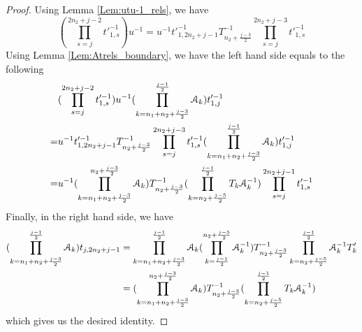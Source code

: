 \documentclass{amsart}
\begin{document}
\begin{proof}
Using Lemma \ref{Lem:utu-1_rels}, we have
\[
(\prod^{2n_2+j-2}_{s=j} t'^{-1}_{1,s})u^{-1}=u^{-1} t'^{-1}_{1,2n_2+j-1}T^{-1}_{n_2+\frac{j-3}{2}}\prod^{2n_2+j-3}_{s=j} t'^{-1}_{1,s}
\]
Using Lemma \ref{Lem:Atrels_boundary}, we have the left hand side equals to the following
\[
\begin{aligned}
&(\prod^{2n_2+j-2}_{s=j} t'^{-1}_{1,s})u^{-1}(\prod^{\frac{j-1}{2}}_{k=n_1+n_2+\frac{j-3}{2}}\AA_{k})t'^{-1}_{1,j}\\
=&u^{-1} t'^{-1}_{1,2n_2+j-1}T^{-1}_{n_2+\frac{j-3}{2}}\prod^{2n_2+j-3}_{s=j} t'^{-1}_{1,s}(\prod^{\frac{j-1}{2}}_{k=n_1+n_2+\frac{j-3}{2}}\AA_{k})t'^{-1}_{1,j}\\
=&u^{-1}(\prod^{n_2+\frac{j-3}{2}}_{k=n_1+n_2+\frac{j-3}{2}}\AA_{k})T^{-1}_{n_2+\frac{j-3}{2}}(\prod^{\frac{j-1}{2}}_{k=n_2+\frac{j-5}{2}}T_k\AA^{-1}_{k})\prod^{2n_2+j-1}_{s=j} t'^{-1}_{1,s}\\
\end{aligned}
\]
Finally, in the right hand side, we have
\[
\begin{aligned}
(\prod^{\frac{j-1}{2}}_{k=n_1+n_2+\frac{j-3}{2}}\AA_k )t_{j,2n_2+j-1}&=\prod^{\frac{j-1}{2}}_{k=n_1+n_2+\frac{j-3}{2}}\AA_k(\prod^{n_2+\frac{j-5}{2}}_{k=\frac{j-1}{2}}\AA^{-1}_k)T^{-1}_{n_2+\frac{j-3}{2}}\prod^{\frac{j-1}{2}}_{k=n_2+\frac{j-5}{2}}\AA^{-1}_kT'_k\\
&=(\prod^{n_2+\frac{j-3}{2}}_{k=n_1+n_2+\frac{j-3}{2}}\AA_{k})T^{-1}_{n_2+\frac{j-3}{2}}(\prod^{\frac{j-1}{2}}_{k=n_2+\frac{j-5}{2}}T_k\AA^{-1}_{k})
\end{aligned}
\]
which gives us the desired identity.


\end{proof}
\end{document}
